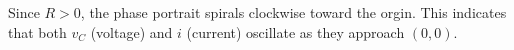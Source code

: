 \documentclass[preview]{standalone}
\begin{document}
\begin{center}
\raggedright
                    Since $R > 0$, the phase portrait spirals clockwise toward the orgin. This indicates
                    that both $v_C$ (voltage) and $i$ (current) oscillate as they approach $(0,0)$.
\end{center}
\end{document}
